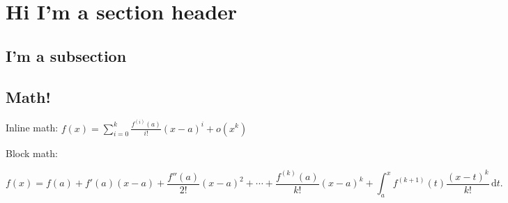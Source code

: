 \documentclass[12pt]{article}
\begin{document}
	
	\raggedright
	
	\section*{Hi I'm a section header}
	\kant[1-2]
	
	\subsection*{I'm a subsection}
	\kant[2]
	
	\subsection*{Math!}
	Inline math: $f(x) = \sum_{i=0}^k \frac{f^{(i)}(a)}{i!}(x-a)^i + o(x^k)$
	
	Block math:
	
	$$
	f(x) = f(a) +f'(a)(x-a) + \frac{f''(a)}{2!}(x-a)^2 +\cdots+
	\frac{f^{(k)}(a)}{k!}(x-a)^k +\int_a^x f^{(k+1)}(t)\frac{(x-t)^k}{k!}\,\mathrm{d}t.
	$$
\end{document}
